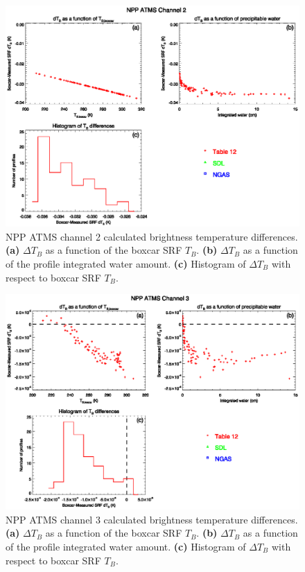 \begin{figure}[H]
  \centering
  \includegraphics[scale=1]{graphics/dtb/atms_npp.ch2.TbStats.eps}
  \caption{NPP ATMS channel 2 calculated brightness temperature differences. \textbf{(a)} $\Delta T_B$ as a function of the boxcar SRF $T_B$. \textbf{(b)} $\Delta T_B$ as a function of the profile integrated water amount. \textbf{(c)} Histogram of $\Delta T_B$ with respect to boxcar SRF $T_B$.}
  \label{fig:atms_npp.ch2.dtb}
\end{figure}

\begin{figure}[H]
  \centering
  \includegraphics[scale=1]{graphics/dtb/atms_npp.ch3.TbStats.eps}
  \caption{NPP ATMS channel 3 calculated brightness temperature differences. \textbf{(a)} $\Delta T_B$ as a function of the boxcar SRF $T_B$. \textbf{(b)} $\Delta T_B$ as a function of the profile integrated water amount. \textbf{(c)} Histogram of $\Delta T_B$ with respect to boxcar SRF $T_B$.}
  \label{fig:atms_npp.ch3.dtb}
\end{figure}

